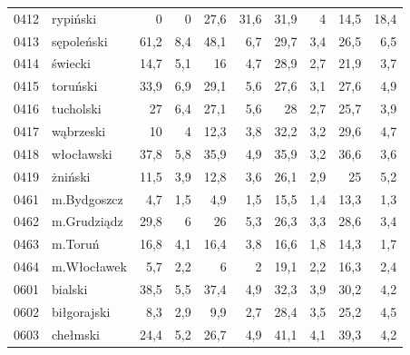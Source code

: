 \begin{center}
\begin{longtable}{lp{3cm}rrrrrrrr}
0412 & rypiński                & 0       & 0           & 27,6     & 31,6         & 31,9     & 4            & 14,5     & 18,4         \\
0413 & sępoleński              & 61,2    & 8,4         & 48,1     & 6,7          & 29,7     & 3,4          & 26,5     & 6,5          \\
0414 & świecki                 & 14,7    & 5,1         & 16       & 4,7          & 28,9     & 2,7          & 21,9     & 3,7          \\
0415 & toruński                & 33,9    & 6,9         & 29,1     & 5,6          & 27,6     & 3,1          & 27,6     & 4,9          \\
0416 & tucholski               & 27      & 6,4         & 27,1     & 5,6          & 28       & 2,7          & 25,7     & 3,9          \\
0417 & wąbrzeski               & 10      & 4           & 12,3     & 3,8          & 32,2     & 3,2          & 29,6     & 4,7          \\
0418 & włocławski              & 37,8    & 5,8         & 35,9     & 4,9          & 35,9     & 3,2          & 36,6     & 3,6          \\
0419 & żniński                 & 11,5    & 3,9         & 12,8     & 3,6          & 26,1     & 2,9          & 25       & 5,2          \\
0461 & m.Bydgoszcz             & 4,7     & 1,5         & 4,9      & 1,5          & 15,5     & 1,4          & 13,3     & 1,3          \\
0462 & m.Grudziądz             & 29,8    & 6           & 26       & 5,3          & 26,3     & 3,3          & 28,6     & 3,4          \\
0463 & m.Toruń                 & 16,8    & 4,1         & 16,4     & 3,8          & 16,6     & 1,8          & 14,3     & 1,7          \\
0464 & m.Włocławek             & 5,7     & 2,2         & 6        & 2            & 19,1     & 2,2          & 16,3     & 2,4          \\
0601 & bialski                 & 38,5    & 5,5         & 37,4     & 4,9          & 32,3     & 3,9          & 30,2     & 4,2          \\
0602 & biłgorajski             & 8,3     & 2,9         & 9,9      & 2,7          & 28,4     & 3,5          & 25,2     & 4,5          \\
0603 & chełmski                & 24,4    & 5,2         & 26,7     & 4,9          & 41,1     & 4,1          & 39,3     & 4,2          \\

\end{longtable}
\end{center}
